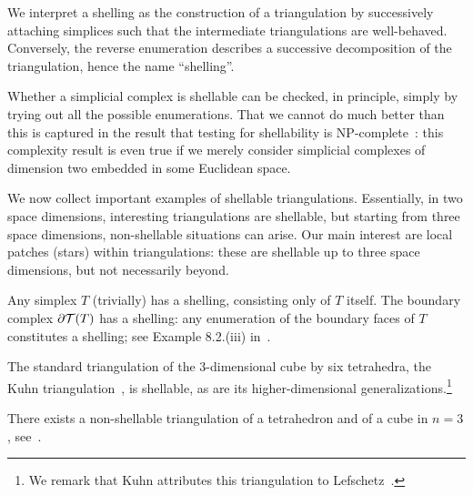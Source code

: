 \documentclass[10pt,a4paper]{article}
\begin{document}
\begin{remark}
    We interpret a shelling as the construction of a triangulation 
    by successively attaching simplices such that the intermediate triangulations are well-behaved. 
    Conversely, the reverse enumeration describes a successive decomposition of the triangulation, hence the name ``shelling''.
\end{remark}
\begin{remark}
    Whether a simplicial complex is shellable can be checked, in principle, simply by trying out all the possible enumerations.
    That we cannot do much better than this is captured in the result that testing for shellability is NP-complete~\cite{goaoc2019shellability}:
    this complexity result is even true if we merely consider simplicial complexes of dimension two embedded in some Euclidean space.
\end{remark}

We now collect important examples of shellable triangulations. Essentially, in two space dimensions, interesting triangulations are shellable, but starting from three space dimensions, non-shellable situations can arise. Our main interest are local patches (stars) within triangulations: these are shellable up to three space dimensions, but not necessarily beyond. 

\begin{example}\label{example:shell_simpl}
    Any simplex $T$ (trivially) has a shelling, consisting only of $T$ itself. 
    The boundary complex $\partial {\mathcal T}(T)$ has a shelling:
    any enumeration of the boundary faces of $T$ constitutes a shelling; see Example 8.2.(iii) in~\cite{ziegler1995lectures}.
\end{example}
\begin{example}
    The standard triangulation of the $3$-dimensional cube by six tetrahedra, the Kuhn triangulation~\cite{kuhn1960some}, is shellable, as are its higher-dimensional generalizations.\footnote{We remark that Kuhn attributes this triangulation to Lefschetz~\cite{lefschetz2015introduction}.}
\end{example}
\begin{example}
    There exists a non-shellable triangulation of a tetrahedron and of a cube in $n=3$, see~\cite[Example 8.9]{ziegler1995lectures}.
\end{example}
\end{document}
